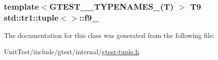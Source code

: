 \hypertarget{singletonstd_1_1tr1_1_1tuple_a336d5e582fd34e45ec88c78d473671dd}{
\subsubsection[{f9\+\_\+}]{\setlength{\rightskip}{0pt plus 5cm}template$<$G\+T\+E\+S\+T\+\_\+\_\+\+T\+Y\+P\+E\+N\+A\+M\+E\+S\+\_\+(\+T) $>$ T9 {\bf std\+::tr1\+::tuple}$<$$>$\+::f9\+\_\+}}\label{singletonstd_1_1tr1_1_1tuple_a336d5e582fd34e45ec88c78d473671dd}


The documentation for this class was generated from the following file\+:\begin{DoxyCompactItemize}
\item 
Unit\+Test/include/gtest/internal/\hyperlink{gtest-tuple_8h}{gtest-\/tuple.\+h}\end{DoxyCompactItemize}
